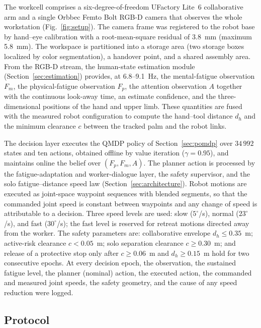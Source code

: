 The workcell comprises a six-degree-of-freedom UFactory Lite~6 collaborative arm and a single Orbbec Femto
Bolt RGB-D camera that observes the whole workstation (Fig.~\ref{fig:setup}). The camera frame was registered
to the robot base by hand--eye calibration with a root-mean-square residual of 3.8~mm (maximum 5.8~mm).
The workspace is partitioned into a storage area (two storage boxes localized by color segmentation),
a handover point, and a shared assembly area. From the RGB-D stream, the human-state estimation module
(Section~\ref{sec:estimation}) provides, at 6.8--9.1~Hz, the mental-fatigue observation $F_m$, the
physical-fatigue observation $F_p$, the attention observation $A$ together with the continuous look-away
time, an estimate confidence, and the three-dimensional positions of the hand and upper limb. These
quantities are fused with the measured robot configuration to compute the hand--tool distance $d_h$ and
the minimum clearance $c$ between the tracked palm and the robot links.

The decision layer executes the QMDP policy of Section~\ref{sec:pomdp} over $34\,992$ states and ten
actions, obtained offline by value iteration ($\gamma = 0.95$), and maintains online the belief over
$(F_p, F_m, A)$. The planner action is processed by the fatigue-adaptation and worker-dialogue layer, the
safety supervisor, and the solo fatigue--distance speed law (Section~\ref{sec:architecture}). Robot motions
are executed as joint-space waypoint sequences with blended segments, so that the commanded joint speed is
constant between waypoints and any change of speed is attributable to a decision. Three speed levels are
used: slow ($5^\circ$/s), normal ($23^\circ$/s), and fast ($30^\circ$/s); the fast level is reserved for
retreat motions directed away from the worker. The safety parameters are: collaborative envelope
$d_h \le 0.35$~m; active-risk clearance $c < 0.05$~m; solo separation clearance $c \ge 0.30$~m; and release
of a protective stop only after $c \ge 0.06$~m and $d_h \ge 0.15$~m hold for two consecutive epochs. At every
decision epoch, the observation, the sustained fatigue level, the planner (nominal) action, the executed
action, the commanded and measured joint speeds, the safety geometry, and the cause of any speed reduction
were logged.

\subsection{Protocol}
\label{sec:protocol}

